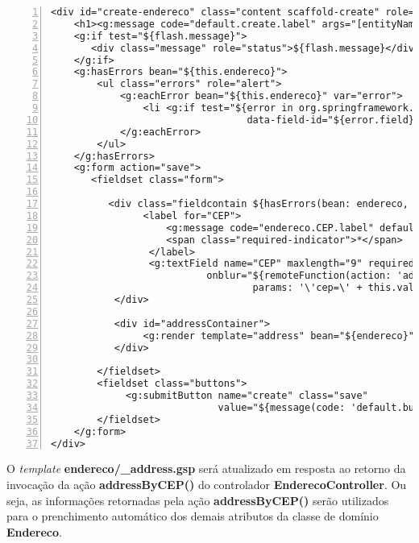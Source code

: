 \begin{lstlisting}[caption={\bf endereco/create.gsp},
    frame=trBL, float=htbp, label=codEnderecoCreate, numbers=left]
<div id="create-endereco" class="content scaffold-create" role="main">
    <h1><g:message code="default.create.label" args="[entityName]" /></h1>
    <g:if test="${flash.message}">
       <div class="message" role="status">${flash.message}</div>
    </g:if>
    <g:hasErrors bean="${this.endereco}">
        <ul class="errors" role="alert">
            <g:eachError bean="${this.endereco}" var="error">
                <li <g:if test="${error in org.springframework.validation.FieldError}">
                                  data-field-id="${error.field}"</g:if>><g:message error="${error}"/></li>
            </g:eachError>
        </ul>
    </g:hasErrors>
    <g:form action="save">
       <fieldset class="form">

          <div class="fieldcontain ${hasErrors(bean: endereco, field: 'CEP', 'error')} required">
                <label for="CEP">
                    <g:message code="endereco.CEP.label" default="CEP" />
                    <span class="required-indicator">*</span>
                 </label>
                 <g:textField name="CEP" maxlength="9" required="" value="${endereco?.CEP}"
                           onblur="${remoteFunction(action: 'addressByCEP', update: [success: 'addressContainer'],
                                   params: '\'cep=\' + this.value', asynchronous: false)}"/>
           </div>

           <div id="addressContainer">
                <g:render template="address" bean="${endereco}"/>
           </div>

        </fieldset>
        <fieldset class="buttons">
             <g:submitButton name="create" class="save" 
                             value="${message(code: 'default.button.create.label', default: 'Create')}" />
        </fieldset>
    </g:form>
</div>
\end{lstlisting}

O  {\it template} {\bf  endereco/\_address.gsp} será  atualizado em  resposta ao
retorno  da   invocação  da  ação  {\bf  addressByCEP()}   do  controlador  {\bf
  EnderecoController}.   Ou  seja,  as  informações retornadas  pela  ação  {\bf
  addressByCEP()}  serão utilizados  para o  prenchimento automático  dos demais
atributos da classe de domínio {\bf Endereco}.  

\vspace{0.2cm}

